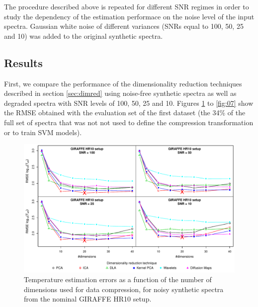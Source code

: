 \documentclass[a4paper,fleqn,usenatbib]{mnras}
\begin{document}
{{{The procedure described above is repeated for different SNR regimes in
order to study the dependency of the estimation performace on the
noise level of the input spectra. Gaussian white noise of different
variances (SNRs equal to 100, 50, 25 and 10) was added to the original
synthetic spectra. 

\subsection{Results}

First, we compare the performance of the dimensionality reduction
techniques described in section \ref{sec:dimred} using noise-free
synthetic spectra as well as degraded spectra with SNR levels of 100,
50, 25 and 10. Figures \ref{fig:02} to \ref{fig:07} show the RMSE
obtained with the evaluation set of the first dataset (the 34\% 
of the full set of spectra that was not not used to define the 
compression transformation or to train SVM models).

\begin{figure}
\centering\includegraphics[width=\textwidth]{flamesHR10_Teff_log_BestSVM_N-RMSE_test.pdf}
\caption{Temperature estimation errors as a function of the number of
  dimensions used for data compression, for noisy synthetic
  spectra from the nominal GIRAFFE HR10 setup.}
\label{fig:02}
\end{figure}

}}}
\end{document}
